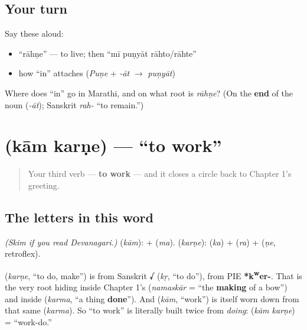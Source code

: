 \subsection*{Your turn}
Say these aloud:

\begin{itemize}
\raggedright
  \item \textquotedblleft{}rāhṇe\textquotedblright{} — to live; then \textquotedblleft{}mī puṇyāt rāhto/rāhte\textquotedblright{}
  \item how \textquotedblleft{}in\textquotedblright{} attaches (\emph{Puṇe} + \emph{-āt} $\to$ \emph{puṇyāt})
\end{itemize}

\begin{tcolorbox}[breakable,colback=teal!4,colframe=teal!35!black,title={Before you move on}]
Where does \textquotedblleft{}in\textquotedblright{} go in Marathi, and on what root is \emph{rāhṇe}? (On the \textbf{end} of the noun (\emph{-āt}); Sanskrit \emph{rah-} \textquotedblleft{}to remain.\textquotedblright{})
\end{tcolorbox}
\section[\texorpdfstring{\mr{काम} \mr{करणे} (kām karṇe)}{काम करणे (kām karṇe)}]{  (kām karṇe) — \textquotedblleft{}to work\textquotedblright{}}

\label{lesson:MR-C05-kaam-karne}



\begin{quote}
Your third verb — \textbf{to work} — and it closes a circle back to Chapter 1's greeting.
\end{quote}

\subsection*{The letters in this word}
\emph{(Skim if you read Devanagari.)} \textbf{} (\emph{kām}): \textbf{} + \textbf{} (\emph{ma}). \textbf{} (\emph{karṇe}): \textbf{} (\emph{ka}) + \textbf{} (\emph{ra}) + \textbf{} (\emph{ṇe}, retroflex).

\begin{cousinweb}
\textbf{} (\emph{karṇe}, \textquotedblleft{}to do, make\textquotedblright{}) is from Sanskrit \textbf{√} (\emph{kṛ}, \textquotedblleft{}to do\textquotedblright{}), from PIE \textbf{*k\textsuperscript{w}er-}. That is the very root hiding inside Chapter 1's \textbf{} (\emph{namaskār} = \textquotedblleft{}the \textbf{making} of a bow\textquotedblright{}) and inside \textbf{} (\emph{karma}, \textquotedblleft{}a thing \textbf{done}\textquotedblright{}). And \textbf{} (\emph{kām}, \textquotedblleft{}work\textquotedblright{}) is itself worn down from that same \textbf{} (\emph{karma}). So \textquotedblleft{}to work\textquotedblright{} is literally built twice from \emph{doing}: \textbf{ } (\emph{kām karṇe}) = \textquotedblleft{}work-do.\textquotedblright{}
\end{cousinweb}

